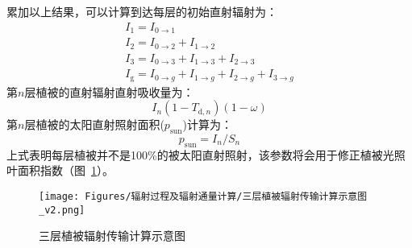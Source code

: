 累加以上结果，可以计算到达每层的初始直射辐射为：
\begin{equation}
  \begin{array}{l}I_{1}=I_{0 \rightarrow 1} \\ I_{2}=I_{0 \rightarrow 2}+I_{1 \rightarrow 2} \\
    I_{3}=I_{0 \rightarrow 3}+I_{1 \rightarrow 3}+I_{2 \rightarrow 3} \\
  I_{\mathrm g}=I_{0 \rightarrow g}+I_{1 \rightarrow g}+I_{2 \rightarrow g}+I_{3 \rightarrow g}\end{array}
\end{equation}
第$n$层植被的直射辐射直射吸收量为：
\begin{equation}
  I_{n}\left(1-T_{\mathrm{d}, n}\right)(1-\omega)
\end{equation}
第$n$层植被的太阳直射照射面积($p_{\mathrm{sun}}$)计算为：
\begin{equation}
  p_{\mathrm{sun}}=I_{n} / S_{n}
\end{equation}
上式表明每层植被并不是100\%的被太阳直射照射，该参数将会用于修正植被光照叶面积指数（图~\ref{fig:三层植被辐射传输计算示意图}）。
{
  \begin{figure}[htbp]
    \centering
    \texttt{[image: Figures/辐射过程及辐射通量计算/三层植被辐射传输计算示意图\_v2.png]}
    \caption{三层植被辐射传输计算示意图}
    \label{fig:三层植被辐射传输计算示意图}
  \end{figure}
}

